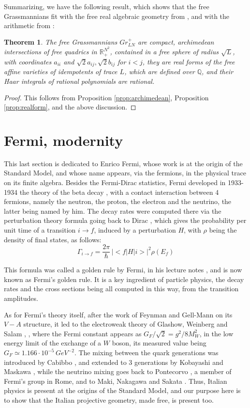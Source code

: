 \documentclass[11pt]{article}
\theoremstyle{plain}
\newtheorem{theorem}{Theorem}[section]
\begin{document}
\bigskip

Summarizing, we have the following result, which shows that the free Grassmannians fit with the free real algebraic geometry from \cite{fba}, and with the arithmetic from \cite{oba}:

\begin{theorem}
The free Grassmannians $Gr^+_{LN}$ are compact, archimedean intersections of free quadrics in $\mathbb R^{N^2}_+$, contained in a free sphere of radius $\sqrt{L}$, with coordinates $a_{ii}$ and $\sqrt{2}a_{ij},\sqrt{2}b_{ij}$ for $i<j$, they are real forms of the free affine varieties of idempotents of trace $L$, which are defined over $\mathbb Q$, and their Haar integrals of rational polynomials are rational.
\end{theorem}

\begin{proof}
This follows from Proposition \ref{prop:archimedean}, Proposition \ref{prop:realform}, and the above discussion.
\end{proof}

\section{Fermi, modernity}

This last section is dedicated to Enrico Fermi, whose work is at the origin of the Standard Model, and whose name appears, via the fermions, in the physical trace on its finite algebra. Besides the Fermi-Dirac statistics, Fermi developed in 1933-1934 the theory of the beta decay \cite{fer}, with a contact interaction between 4 fermions, namely the neutron, the proton, the electron and the neutrino, the latter being named by him. The decay rates were computed there via the perturbation theory formula going back to Dirac \cite{dir}, which gives the probability per unit time of a transition $i\to f$, induced by a perturbation $H$, with $\rho$ being the density of final states, as follows:
$$\Gamma_{i\to f}=\frac{2\pi}{\hbar}\,|<f|H|i>|^2\rho(E_f)$$

This formula was called a golden rule by Fermi, in his lecture notes \cite{fnp}, and is now known as Fermi's golden rule. It is a key ingredient of particle physics, the decay rates and the cross sections being all computed in this way, from the transition amplitudes.

\bigskip

As for Fermi's theory itself, after the work of Feynman and Gell-Mann \cite{fge} on its $V-A$ structure, it led to the electroweak theory of Glashow, Weinberg and Salam \cite{gla}, \cite{wei}, where the Fermi constant appears as $G_F/\sqrt{2}=g^2/8M_W^2$, in the low energy limit of the exchange of a $W$ boson, its measured value being $G_F\simeq1.166\cdot10^{-5}\,GeV^{-2}$. The mixing between the quark generations was introduced by Cabibbo \cite{cab}, and extended to 3 generations by Kobayashi and Maskawa \cite{kma}, while the neutrino mixing goes back to Pontecorvo \cite{pon}, a member of Fermi's group in Rome, and to Maki, Nakagawa and Sakata \cite{mns}. Thus, Italian physics is present at the origins of the Standard Model, and our purpose here is to show that the Italian projective geometry, made free, is present too.
\end{document}
